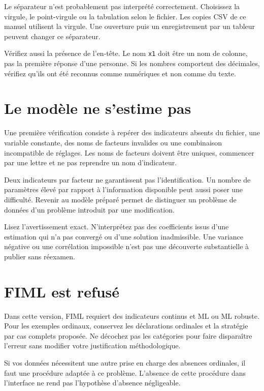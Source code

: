 \documentclass[
  french,
  11pt,
  a4paper,
  DIV=11,
  numbers=noendperiod]{scrreprt}
\begin{document}
Le séparateur n'est probablement pas interprété correctement. Choisissez
la virgule, le point-virgule ou la tabulation selon le fichier. Les
copies CSV de ce manuel utilisent la virgule. Une ouverture puis un
enregistrement par un tableur peuvent changer ce séparateur.

Vérifiez aussi la présence de l'en-tête. Le nom \texttt{x1} doit être un
nom de colonne, pas la première réponse d'une personne. Si les nombres
comportent des décimales, vérifiez qu'ils ont été reconnus comme
numériques et non comme du texte.

\section{Le modèle ne s'estime pas}\label{le-moduxe8le-ne-sestime-pas}

Une première vérification consiste à repérer des indicateurs absents du
fichier, une variable constante, des noms de facteurs invalides ou une
combinaison incompatible de réglages. Les noms de facteurs doivent être
uniques, commencer par une lettre et ne pas reprendre un nom
d'indicateur.

Deux indicateurs par facteur ne garantissent pas l'identification. Un
nombre de paramètres élevé par rapport à l'information disponible peut
aussi poser une difficulté. Revenir au modèle préparé permet de
distinguer un problème de données d'un problème introduit par une
modification.

Lisez l'avertissement exact. N'interprétez pas des coefficients issus
d'une estimation qui n'a pas convergé ou d'une solution inadmissible.
Une variance négative ou une corrélation impossible n'est pas une
découverte substantielle à publier sans réexamen.

\section{FIML est refusé}\label{fiml-est-refusuxe9}

Dans cette version, FIML requiert des indicateurs continus et ML ou ML
robuste. Pour les exemples ordinaux, conservez les déclarations
ordinales et la stratégie par cas complets proposée. Ne décochez pas les
catégories pour faire disparaître l'erreur sans modifier votre
justification méthodologique.

Si vos données nécessitent une autre prise en charge des absences
ordinales, il faut une procédure adaptée à ce problème. L'absence de
cette procédure dans l'interface ne rend pas l'hypothèse d'absence
négligeable.
\end{document}
